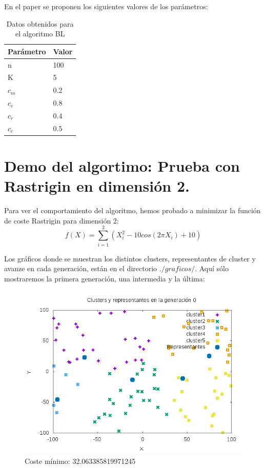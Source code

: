 En el  paper se proponen los siguientes valores de los parámetros:\\

\begin{table}[htbp]
	\begin{center}
		\begin{tabular}{|l|l|}
			\hline
			Parámetro & Valor \\
			\hline \hline
			n & 100\\ \hline
			K & 5\\ \hline
			$c_m$ & 0.2\\ \hline
			$c_e$ & 0.8\\ \hline
			$c_r$ & 0.4\\ \hline
			$c_c$ & 0.5\\ \hline
			
		\end{tabular}
		\caption{Datos obtenidos para el algoritmo BL}
		\label{tabla:}
	\end{center}
\end{table}




\newpage

\section{Demo del algortimo: Prueba con Rastrigin en dimensión 2.}

Para ver el comportamiento del algoritmo, hemos probado a minimizar la función de coste Rastrigin para dimensión 2:\\

\[f(X)=\sum_{i=1}^{2}(X_i^2-10cos(2\pi X_i)+10)\]

Los gráficos donde se muestran los distintos clusters, representantes de cluster y avanze en cada generación, están en el directorio $./graficos/$. Aquí sólo mostraremos la primera generación, una intermedia y la última:\\

\begin{figure}[H]
\centering
\includegraphics[width=0.7\linewidth]{graficos/0out}
\caption{Coste mínimo: 32.063385819971245}
\label{fig:0out}
\end{figure}

